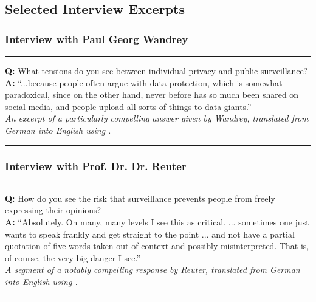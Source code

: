 \documentclass[12pt]{article}
\newcommand{\quotecard}[2]{%
	\begin{center}
		\begin{minipage}{0.93\linewidth}
			\hrule\vspace{6pt}
			#2
			\vspace{6pt}\hrule
		\end{minipage}
	\end{center}
}
\begin{document}
\begin{appendices}
		\subsection{Selected Interview Excerpts}
		
		\subsubsection{Interview with Paul Georg Wandrey}

		\vspace{0.8em}
		\quotecard{wandrey}{
			\textbf{Q:} What tensions do you see between individual privacy and public surveillance? \\[4pt]
			\textbf{A:} “...because people often argue with data protection, which is somewhat paradoxical, since on the other hand, never before has so much been shared on social media, and people upload all sorts of things to data giants.” \\[6pt]
			\emph{An excerpt of a particularly compelling answer given by Wandrey, translated from German into English using \textcite{googletranslate}.}
		}
		
		\vspace{1.5em}
		
		\subsubsection{Interview with Prof. Dr. Dr. Reuter}
		\vspace{0.8em}
		\quotecard{reuter}{
			\textbf{Q:} How do you see the risk that surveillance prevents people from freely expressing their opinions? \\[4pt]
			\textbf{A:} “Absolutely. On many, many levels I see this as critical. ... sometimes one just wants to speak frankly and get straight to the point ... and not have a partial quotation of five words taken out of context and possibly misinterpreted. That is, of course, the very big danger I see.” \\[6pt]
			\emph{A segment of a notably compelling response by Reuter, translated from German into English using \textcite{googletranslate}.}
		}
		
		
	\end{appendices}
	
\end{document}
